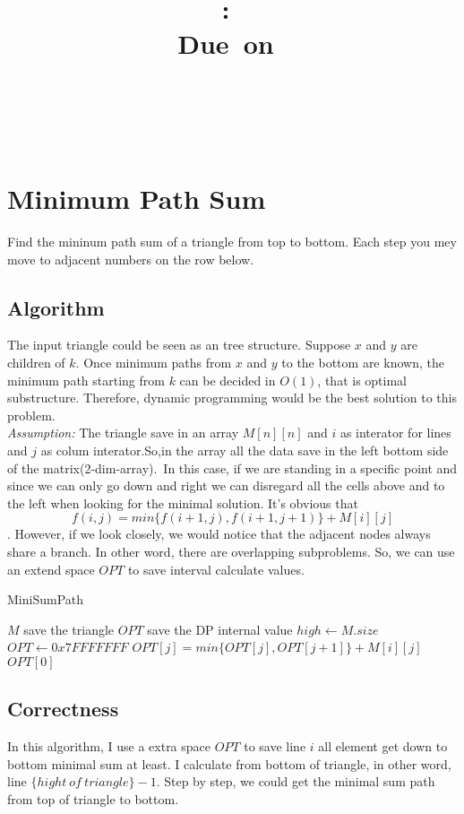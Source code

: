 \documentclass{article}
\title{
\vspace{2in}
\textmd{\textbf{\hmwkClass:\ \hmwkTitle}}\\
\normalsize\vspace{0.1in}\small{Due\ on\ \hmwkDueDate}\\
\vspace{0.1in}\large{\textit{\hmwkClassInstructor\ \hmwkClassTime}}
\vspace{3in}
}
\author{\textbf{\hmwkAuthorName}\\\textbf{\hmwkAuthorStuID}}
\date{} %
\numberwithin{equation}{section}
\begin{document}
\maketitle
\newpage


%
%
\section{Minimum Path Sum}
Find the mininum path sum of a triangle from top to bottom. Each step you mey move to adjacent numbers on the row below.
	\subsection{Algorithm}
	The input triangle could be seen as an tree structure. Suppose $x$ and $y$ are children of $k$. Once minimum paths from $x$ and $y$ to the bottom are known, the minimum path starting from $k$ can be decided in $O(1)$, that is optimal substructure. Therefore, dynamic programming would be the best solution to this problem.\\
	\emph{Assumption:} The triangle save in an array $M[n][n]$ and $i$ as interator for lines and $j$ as colum interator.So,in the array all the data save in the left bottom side of the matrix(2-dim-array).\
	In this case, if we are standing in a specific point and since we can only go down and right we can disregard all the cells above and to the left when looking for the minimal solution.
	It's obvious that $$f(i,j) = min\{f(i+1,j),f(i+1,j+1)\} + M[i][j]$$. However, if we look closely, we would notice that the adjacent nodes always share a branch. In other word, there are overlapping subproblems. So, we can use an extend space $OPT$ to save interval calculate values.
		\alglanguage{pseudocode}
		\begin{algorithm}
			\caption{MiniSumPath}
			\label{alg1}
			\begin{algorithmic}[1]
			\REQUIRE $M$ save the triangle
			\REQUIRE $OPT$ save the DP internal value
			\STATE $high \gets M.size$
			\STATE $OPT \gets 0x7FFFFFFF$
					\STATE $OPT[j] = min\{OPT[j],OPT[j+1]\} + M[i][j]$ 
				\ENDFOR
			\ENDFOR
			\RETURN $OPT[0]$
			\EndFunction			
			\end{algorithmic}
		\end{algorithm}
	\subsection{Correctness}
	In this algorithm, I use a extra space $OPT$ to save line $i$ all element get down to bottom minimal sum at least.
	I calculate from bottom of triangle, in other word, line $\{hight\ of \ triangle\} - 1$. Step by step, we could get the minimal sum path from top of triangle to bottom.
\end{document}
